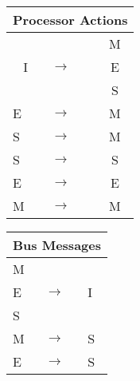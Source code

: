 \documentclass{article}
\begin{document}
\begin{multicols*}{2}
\begin{table}[H]
\centering
\begin{tabular}{|l|l|c|l|l|}
\hline
\multicolumn{5}{|c|}{Processor Actions}                                                       \\ \hline\hline
\multicolumn{1}{|c|}{\multirow{3}{*}{I}} & \multirow{3}{*}{$\rightarrow$} & \multicolumn{3}{c|}{M} \\ \cline{3-5} 
\multicolumn{1}{|c|}{}                   &                                & \multicolumn{3}{c|}{E} \\ \cline{3-5} 
\multicolumn{1}{|c|}{}                   &                                & \multicolumn{3}{c|}{S} \\ \hline\hline
E                                        & $\rightarrow$                  & \multicolumn{3}{c|}{M} \\ \hline
S                                        & $\rightarrow$                  & \multicolumn{3}{c|}{M} \\ \hline\hline
S                                        & $\rightarrow$                  & \multicolumn{3}{c|}{S} \\ \hline
E                                        & $\rightarrow$                  & \multicolumn{3}{c|}{E} \\ \hline
M                                        & $\rightarrow$                  & \multicolumn{3}{c|}{M} \\ \hline
\end{tabular}
\end{table}

\begin{table}[H]
\centering
\begin{tabular}{|l|l|l|}
\hline
\multicolumn{3}{|l|}{Bus Messages}           \\ \hline\hline
M & \multirow{3}{*}{$\rightarrow$} & \multirow{3}{*}{I} \\ \cline{1-1}
E & $\rightarrow$                  &                    \\ \cline{1-1}
S & $\rightarrow$                  &                    \\ \hline\hline
M & $\rightarrow$                  & S                  \\ \hline
E & $\rightarrow$                  & S                  \\ \hline
\end{tabular}
\end{table}


\end{multicols*}
\end{document}
